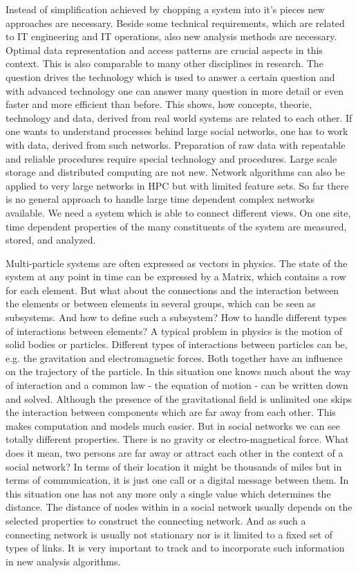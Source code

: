 \documentclass[a4paper,10pt]{scrbook}
\begin{document}
Instead of simplification achieved by chopping a system into it's pieces new approaches are necessary. Beside some technical 
requirements, which are related to IT engineering and IT operations, also new analysis methods are necessary. Optimal data representation and access patterns are crucial aspects in this context. This is also comparable to many other disciplines in research.
The question drives the technology which is used to answer a certain question and with advanced technology one can answer many
question in more detail or even faster and more efficient than before. This shows, how concepts, theorie, technology and data, 
derived from real world systems are related to each other. If one wants to understand processes behind large social networks, one
has to work with data, derived from such networks. Preparation of raw data with repeatable and reliable procedures require special technology and
procedures. Large scale storage and distributed computing are not new. Network algorithms can also be applied to very large networks in HPC but with limited feature sets.
So far there is no general approach to handle large time dependent complex networks available. We need a system which is able to
connect different views. On one site, time dependent properties of the many constituents of the system are measured, stored, and analyzed. 

Multi-particle systems are often expressed as vectors in physics. The state of the system at any point in time can be expressed by a Matrix, which contains
a row for each element. But what about the connections and the interaction between the elements or between elements in several groups, which can be seen as
subsystems. And how to define such a subsystem? How to handle different types of interactions between elements? A typical problem
in physics is the motion of solid bodies or particles. Different types of interactions between particles can be, e.g. the gravitation and 
electromagnetic forces. Both together have an influence on the trajectory of the particle. In this situation one knows much about 
the way of interaction and a common law - the equation of motion - can be written down and solved. Although the presence of the gravitational field is unlimited one
skips the interaction between components which are far away from each other. This makes computation and models much easier.
But in social networks we can see totally different properties. There is no gravity or electro-magnetical force. What does it mean, two persons are far away or attract each other in the context of a social network? In terms of their location
it might be thousands of miles but in terms of communication, it is just one call or a digital message between them. In this situation one has not any more only a single value which determines the distance. The distance of nodes 
within in a social network usually depends on the selected properties to construct the connecting network. And as such a connecting network is usually not stationary nor is it limited to a fixed set of types of links. It is very important to track and to incorporate such information in new analysis algorithms.
\end{document}
